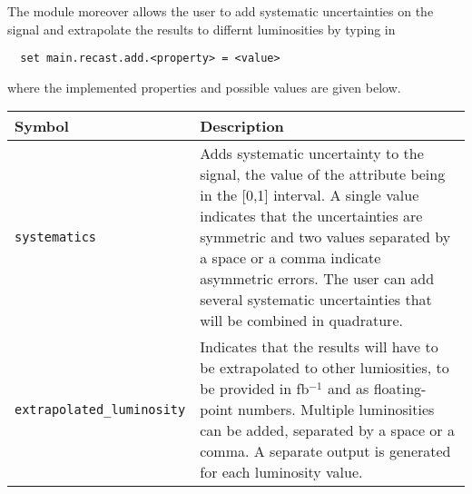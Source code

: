 \documentclass[a4paper]{article}
\begin{document}
\noindent The module moreover allows the user to add systematic uncertainties on
the signal and extrapolate the results to differnt luminosities by typing in
{\color{ao} \begin{verbatim}
  set main.recast.add.<property> = <value>
\end{verbatim}}
\noindent where the implemented properties and possible values are given below.
\renewcommand{\arraystretch}{1.2}%
\begin{center}\begin{tabular}{l p{8.4cm}}
\hline
  Symbol& Description\\
  \hline
  \color{ao} \verb?systematics? & Adds systematic uncertainty to the signal, the
    value of the attribute being in the [0,1] interval. A single value indicates
    that the uncertainties are symmetric and two values separated by a space or
    a comma indicate asymmetric errors. The user can add several systematic
    uncertainties that will be combined in quadrature. \\
  \color{ao} \verb?extrapolated_luminosity?  & Indicates that the results will
    have to be extrapolated to other lumiosities, to be provided in fb$^{-1}$
    and as floating-point numbers. Multiple luminosities can be added, separated
    by a space or a comma. A separate output is generated for each luminosity
    value.\\
  \hline
\end{tabular}
\end{center}
\end{document}
